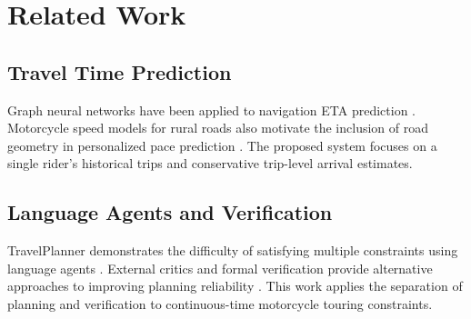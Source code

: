 \section{Related Work}
\subsection{Travel Time Prediction}
Graph neural networks have been applied to navigation ETA prediction \cite{eta}. Motorcycle speed models for rural roads also motivate the inclusion of road geometry in personalized pace prediction \cite{motorcycle}. The proposed system focuses on a single rider's historical trips and conservative trip-level arrival estimates.
\subsection{Language Agents and Verification}
TravelPlanner demonstrates the difficulty of satisfying multiple constraints using language agents \cite{travelplanner}. External critics and formal verification provide alternative approaches to improving planning reliability \cite{modulo,formal}. This work applies the separation of planning and verification to continuous-time motorcycle touring constraints.
